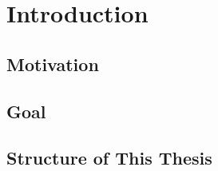 \chapter{Introduction}
\label{ch:introduction}

\section{Motivation}


\section{Goal}


\section{Structure of This Thesis}

